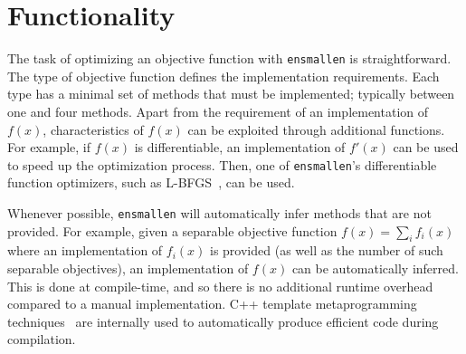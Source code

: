 \documentclass[twoside,11pt]{article}
\begin{document}


\section{Functionality}

The task of optimizing an objective function with {\tt ensmallen} is straightforward.
The type of objective function defines the implementation requirements.
Each type has a minimal set of methods that must be implemented;
typically between one and four methods.
Apart from the requirement of an implementation of $f(x)$,
characteristics of $f(x)$ can be exploited through additional functions.
For example, if $f(x)$ is differentiable,
an implementation of $f'(x)$ can be used to speed up the optimization process.
Then, one of {\tt ensmallen}'s differentiable function optimizers,
such as L-BFGS~\citep{liu1989limited}, can be used.

Whenever possible, {\tt ensmallen} will automatically infer methods
that are not provided.
For example, given a separable objective function
$f(x) = \sum_i f_i(x)$
where an implementation of $f_i(x)$ is provided
(as well as the number of such separable objectives),
an implementation of $f(x)$ can be automatically inferred.
This is done at compile-time, and so there is no additional runtime
overhead compared to a manual implementation.
C++ template metaprogramming techniques~\citep{Abrahams_2004,alexandrescu2001modern}
are internally used to automatically produce efficient code during compilation.
\end{document}
